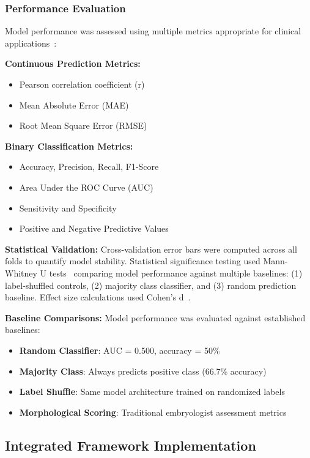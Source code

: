 \subsubsection{Performance Evaluation}

Model performance was assessed using multiple metrics appropriate for clinical applications~\cite{litjens2017survey}:

\textbf{Continuous Prediction Metrics:}
\begin{itemize}
\item Pearson correlation coefficient (r)
\item Mean Absolute Error (MAE) 
\item Root Mean Square Error (RMSE)
\end{itemize}

\textbf{Binary Classification Metrics:}
\begin{itemize}
\item Accuracy, Precision, Recall, F1-Score
\item Area Under the ROC Curve (AUC)
\item Sensitivity and Specificity
\item Positive and Negative Predictive Values
\end{itemize}

\textbf{Statistical Validation:}
Cross-validation error bars were computed across all folds to quantify model stability. Statistical significance testing used Mann-Whitney U tests~\cite{mann1947test} comparing model performance against multiple baselines: (1) label-shuffled controls, (2) majority class classifier, and (3) random prediction baseline. Effect size calculations used Cohen's d~\cite{cohen1988statistical}. 

\textbf{Baseline Comparisons:} Model performance was evaluated against established baselines:
\begin{itemize}
\item \textbf{Random Classifier}: AUC = 0.500, accuracy = 50\%
\item \textbf{Majority Class}: Always predicts positive class (66.7\% accuracy)
\item \textbf{Label Shuffle}: Same model architecture trained on randomized labels
\item \textbf{Morphological Scoring}: Traditional embryologist assessment metrics
\end{itemize}

\subsection{Integrated Framework Implementation}

